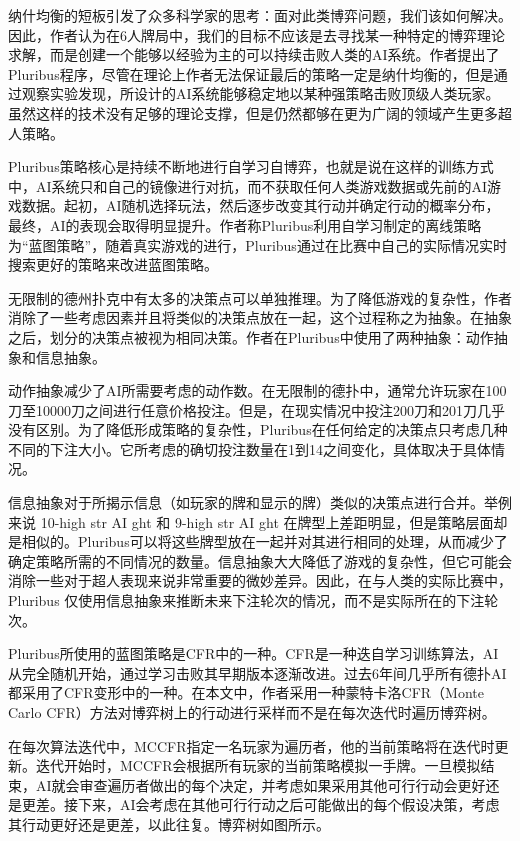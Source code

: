 \documentclass{article}
\begin{document}
纳什均衡的短板引发了众多科学家的思考：面对此类博弈问题，我们该如何解决。因此，作者认为在6人牌局中，我们的目标不应该是去寻找某一种特定的博弈理论求解，而是创建一个能够以经验为主的可以持续击败人类的AI系统。作者提出了Pluribus程序，尽管在理论上作者无法保证最后的策略一定是纳什均衡的，但是通过观察实验发现，所设计的AI系统能够稳定地以某种强策略击败顶级人类玩家。虽然这样的技术没有足够的理论支撑，但是仍然都够在更为广阔的领域产生更多超人策略。\par
Pluribus策略核心是持续不断地进行自学习自博弈，也就是说在这样的训练方式中，AI系统只和自己的镜像进行对抗，而不获取任何人类游戏数据或先前的AI游戏数据。起初，AI随机选择玩法，然后逐步改变其行动并确定行动的概率分布，最终，AI的表现会取得明显提升。作者称Pluribus利用自学习制定的离线策略为“蓝图策略”，随着真实游戏的进行，Pluribus通过在比赛中自己的实际情况实时搜索更好的策略来改进蓝图策略。\par
无限制的德州扑克中有太多的决策点可以单独推理。为了降低游戏的复杂性，作者消除了一些考虑因素并且将类似的决策点放在一起，这个过程称之为抽象。在抽象之后，划分的决策点被视为相同决策。作者在Pluribus中使用了两种抽象：动作抽象和信息抽象。\par
动作抽象减少了AI所需要考虑的动作数。在无限制的德扑中，通常允许玩家在100刀至10000刀之间进行任意价格投注。但是，在现实情况中投注200刀和201刀几乎没有区别。为了降低形成策略的复杂性，Pluribus在任何给定的决策点只考虑几种不同的下注大小。它所考虑的确切投注数量在1到14之间变化，具体取决于具体情况。\par
信息抽象对于所揭示信息（如玩家的牌和显示的牌）类似的决策点进行合并。举例来说 10-high str AI ght 和 9-high str AI ght 在牌型上差距明显，但是策略层面却是相似的。Pluribus可以将这些牌型放在一起并对其进行相同的处理，从而减少了确定策略所需的不同情况的数量。信息抽象大大降低了游戏的复杂性，但它可能会消除一些对于超人表现来说非常重要的微妙差异。因此，在与人类的实际比赛中，Pluribus 仅使用信息抽象来推断未来下注轮次的情况，而不是实际所在的下注轮次。\par
Pluribus所使用的蓝图策略是CFR中的一种。CFR是一种迭自学习训练算法，AI从完全随机开始，通过学习击败其早期版本逐渐改进。过去6年间几乎所有德扑AI都采用了CFR变形中的一种。在本文中，作者采用一种蒙特卡洛CFR（Monte Carlo CFR）方法对博弈树上的行动进行采样而不是在每次迭代时遍历博弈树。\par
在每次算法迭代中，MCCFR指定一名玩家为遍历者，他的当前策略将在迭代时更新。迭代开始时，MCCFR会根据所有玩家的当前策略模拟一手牌。一旦模拟结束，AI就会审查遍历者做出的每个决定，并考虑如果采用其他可行行动会更好还是更差。接下来，AI会考虑在其他可行行动之后可能做出的每个假设决策，考虑其行动更好还是更差，以此往复。博弈树如图所示。\par
\end{document}
